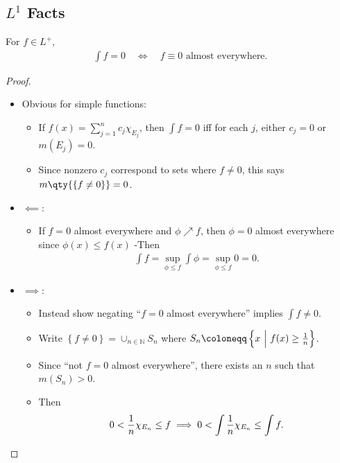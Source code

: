 \hypertarget{l1-facts}{%
\subsection{\texorpdfstring{\(L^1\)
Facts}{L\^{}1 Facts}}\label{l1-facts}}

\begin{proposition}

For \(f\in L^+\),
\begin{align*}  
\int f = 0 \quad\iff\quad f \equiv 0 \text{ almost everywhere}
.\end{align*}

\end{proposition}

\begin{proof}

\envlist

\begin{itemize}
\tightlist
\item
  Obvious for simple functions:

  \begin{itemize}
  \tightlist
  \item
    If \(f(x) = \sum_{j=1}^n c_j \chi_{E_j}\), then \(\int f = 0\) iff
    for each \(j\), either \(c_j=0\) or \(m(E_j) = 0\).
  \item
    Since nonzero \(c_j\) correspond to sets where \(f\neq 0\), this
    says \(m\qty{\left\{{f\neq 0}\right\}} = 0\).
  \end{itemize}
\item
  \(\impliedby\):

  \begin{itemize}
  \tightlist
  \item
    If \(f= 0\) almost everywhere and \(\phi \nearrow f\), then
    \(\phi = 0\) almost everywhere since \(\phi(x) \leq f(x)\) -Then
    \begin{align*}  
    \int f = \sup_{\phi \leq f} \int \phi = \sup_{\phi \leq f} 0 = 0
    .\end{align*}
  \end{itemize}
\item
  \(\implies\):

  \begin{itemize}
  \tightlist
  \item
    Instead show negating ``\(f=0\) almost everywhere'' implies
    \(\int f \neq 0\).
  \item
    Write \(\left\{{f\neq 0}\right\} = \cup_{n\in {\mathbb{N}}} S_n\)
    where
    \(S_n \coloneqq\left\{{x{~\mathrel{\Big|}~}f(x) \geq {1\over n}}\right\}\).
  \item
    Since ``not \(f=0\) almost everywhere'', there exists an \(n\) such
    that \(m(S_n) > 0\).
  \item
    Then
    \begin{align*}  
    0 < {1\over n} \chi_{E_n} \leq f \implies 
    0 < \int {1\over n} \chi_{E_n} \leq \int f
    .\end{align*}
  \end{itemize}
\end{itemize}

\end{proof}


